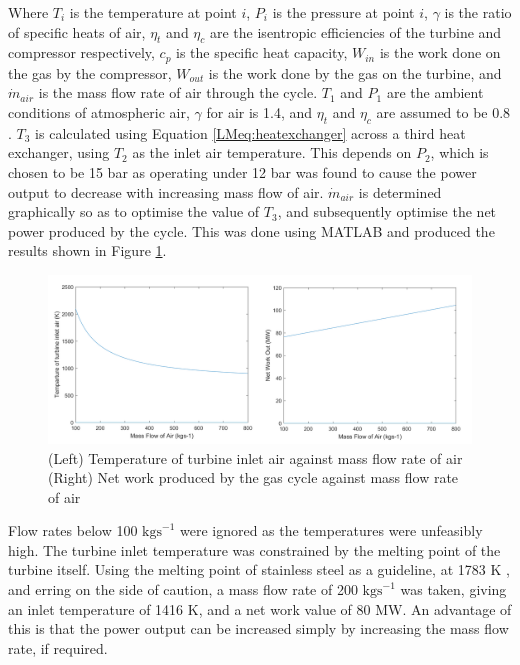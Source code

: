 Where $T_i$ is the temperature at point $i$, $P_i$ is the pressure at point $i$, $\gamma$ is the ratio of specific heats of air, $\eta_t$ and $\eta_c$ are the isentropic efficiencies of the turbine and compressor respectively, $c_p$ is the specific heat capacity, $W_{in}$ is the work done on the gas by the compressor, $W_{out}$ is the work done by the gas on the turbine, and $\dot m_{air}$ is the mass flow rate of air through the cycle. $T_1$ and $P_1$ are the ambient conditions of atmospheric air, $\gamma$ for air is 1.4, and $\eta_t$ and $\eta_c$ are assumed to be 0.8 \cite{NC}. $T_3$ is calculated using Equation \ref{LMeq:heatexchanger} across a third heat exchanger, using $T_2$ as the inlet air temperature. This depends on $P_2$, which is chosen to be 15 bar as operating under 12 bar was found to cause the power output to decrease with increasing mass flow of air. $\dot m_{air}$ is determined graphically so as to optimise the value of $T_3$, and subsequently optimise the net power produced by the cycle. This was done using MATLAB and produced the results shown in Figure \ref{LMfig:gascycleMATLAB}.\\

\begin{figure}[h!]
    \centering
    \includegraphics[scale=0.6]{t3_and_nw_vs_mass_flow_final.png}
    \caption{(Left) Temperature of turbine inlet air against mass flow rate of air\\ (Right) Net work produced by the gas cycle against mass flow rate of air}
    \label{LMfig:gascycleMATLAB}
\end{figure}


Flow rates below 100 $\text{kgs}^{-1}$ were ignored as the temperatures were unfeasibly high. The turbine inlet temperature was constrained by the melting point of the turbine itself. Using the melting point of stainless steel as a guideline, at 1783 K \cite{LM16}, and erring on the side of caution, a mass flow rate of 200 $\text{kgs}^{-1}$ was taken, giving an inlet temperature of 1416 K, and a net work value of 80 MW. An advantage of this is that the power output can be increased simply by increasing the mass flow rate, if required.






